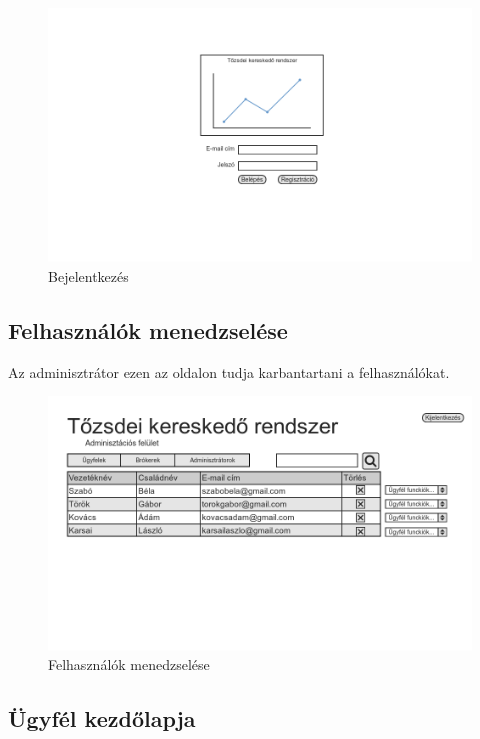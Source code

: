 \begin{figure}[!ht]
\centering
\includegraphics[width=150mm, keepaspectratio]{figures/user_1/login.png}
\caption{Bejelentkezés}
\label{fig:haromreteg}
\end{figure}

\subsection{Felhasználók menedzselése}

Az adminisztrátor ezen az oldalon tudja karbantartani a felhasználókat.

\begin{figure}[!ht]
\centering
\includegraphics[width=150mm, keepaspectratio]{figures/user_1/admin_users.png}
\caption{Felhasználók menedzselése}
\label{fig:haromreteg}
\end{figure}

\subsection{Ügyfél kezdőlapja}

